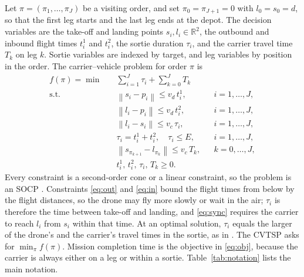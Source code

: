 \documentclass[preprint,12pt,authoryear]{elsarticle}
\newcommand{\norm}[1]{\left\lVert #1 \right\rVert}
\begin{document}
Let $\pi = (\pi_{1},\dots,\pi_{J})$ be a visiting order, and set $\pi_{0} = \pi_{J+1} = 0$ with $l_{0} = s_{0} = d$, so that the first leg starts and the last leg ends at the depot. The decision variables are the take-off and landing points $s_{i}, l_{i} \in \mathbb{R}^{2}$, the outbound and inbound flight times $t^{1}_{i}$ and $t^{2}_{i}$, the sortie duration $\tau_{i}$, and the carrier travel time $T_{k}$ on leg $k$. Sortie variables are indexed by target, and leg variables by position in the order. The carrier--vehicle problem for order $\pi$ is
\begin{align}
f(\pi) = \min \quad & \sum_{i=1}^{J} \tau_{i} + \sum_{k=0}^{J} T_{k} \label{eq:obj} \\
\text{s.t.} \quad & \norm{s_{i} - p_{i}} \le v_{d}\, t^{1}_{i}, && i = 1,\dots,J, \label{eq:out}\\
& \norm{l_{i} - p_{i}} \le v_{d}\, t^{2}_{i}, && i = 1,\dots,J, \label{eq:in}\\
& \norm{l_{i} - s_{i}} \le v_{c}\, \tau_{i}, && i = 1,\dots,J, \label{eq:sync}\\
& \tau_{i} = t^{1}_{i} + t^{2}_{i}, \quad \tau_{i} \le E, && i = 1,\dots,J, \label{eq:end}\\
& \norm{s_{\pi_{k+1}} - l_{\pi_{k}}} \le v_{c}\, T_{k}, && k = 0,\dots,J, \label{eq:leg}\\
& t^{1}_{i},\, t^{2}_{i},\, \tau_{i},\, T_{k} \ge 0 . \label{eq:nonneg}
\end{align}
Every constraint is a second-order cone or a linear constraint, so the problem is an SOCP \citep{lobo1998}. Constraints \eqref{eq:out} and \eqref{eq:in} bound the flight times from below by the flight distances, so the drone may fly more slowly or wait in the air; $\tau_{i}$ is therefore the time between take-off and landing, and \eqref{eq:sync} requires the carrier to reach $l_{i}$ from $s_{i}$ within that time. At an optimal solution, $\tau_{i}$ equals the larger of the drone's and the carrier's travel times in the sortie, as in \citet{erdogan2021}. The CVTSP asks for $\min_{\pi} f(\pi)$. Mission completion time is the objective in \eqref{eq:obj}, because the carrier is always either on a leg or within a sortie. Table~\ref{tab:notation} lists the main notation.
\end{document}
